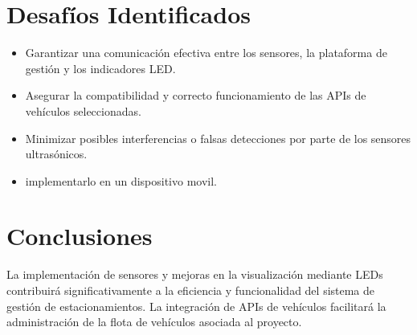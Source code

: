 \documentclass{article}
\begin{document}
\section{Desafíos Identificados}
\begin{itemize}
  \item Garantizar una comunicación efectiva entre los sensores, la plataforma de gestión y los indicadores LED.
  \item Asegurar la compatibilidad y correcto funcionamiento de las APIs de vehículos seleccionadas.
  \item Minimizar posibles interferencias o falsas detecciones por parte de los sensores ultrasónicos.
  \item implementarlo en un dispositivo movil.
\end{itemize}

\section{Conclusiones}
La implementación de sensores y mejoras en la visualización mediante LEDs contribuirá significativamente a la eficiencia y funcionalidad del sistema de gestión de estacionamientos. La integración de APIs de vehículos facilitará la administración de la flota de vehículos asociada al proyecto.
\end{document}
